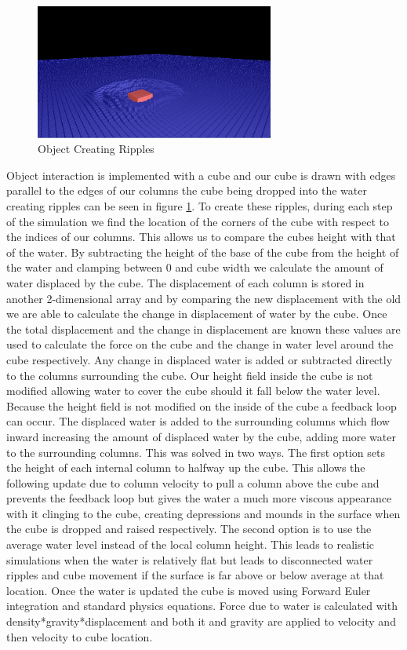 \documentclass[12pt,titlepage]{article}
\begin{document}
\begin{figure}[H]
    \caption{Object Creating Ripples}
    \label{fig:ripples}
    \centering
    \includegraphics[width=0.7\textwidth]{../www/images/objectRipples}
\end{figure}

Object interaction is implemented with a cube and our cube is drawn with edges 
parallel to the edges of our columns the cube being dropped into the water 
creating ripples can be seen in figure \ref{fig:ripples}.  To create these 
ripples, during each step of 
the simulation we 
find the location of the corners of the cube with respect to the indices of our 
columns.  This allows us to compare the cubes height with that of the water.  
By subtracting the height of the base of the cube from the height of the water 
and clamping between 0 and cube width we calculate the amount of water 
displaced by the cube.  The displacement of each column is stored in another 
2-dimensional array and by comparing the new displacement with the old we are 
able to calculate the change in displacement of water by the cube.  Once the 
total displacement and the change in displacement are known these values are 
used to calculate the force on the cube and the change in water level around 
the cube respectively.  Any change in displaced water is added or subtracted 
directly to the columns surrounding the cube.  Our height field inside the cube 
is not modified allowing water to cover the cube should it fall below the water 
level.  Because the height field is not modified on the inside of the cube a 
feedback loop can occur.  The displaced water is added to the surrounding 
columns which flow inward increasing the amount of displaced water by the cube, 
adding more water to the surrounding columns.  This was solved in two ways.  
The first option sets the height of each internal column to halfway up the 
cube.  This allows the following update due to column velocity to pull a column 
above the cube and prevents the feedback loop but gives the water a much more 
viscous appearance with it clinging to the cube, creating depressions and 
mounds in the surface when the cube is dropped and raised respectively.  The 
second option is to use the average water level instead of the local column 
height.  This leads to realistic simulations when the water is relatively flat 
but leads to disconnected water ripples and cube movement if the surface is far 
above or below average at that location.  Once the water is updated the cube is 
moved using Forward Euler integration and standard physics equations.  Force 
due to water is calculated with density*gravity*displacement and both it and 
gravity are applied to velocity and then velocity to cube location.
\end{document}
